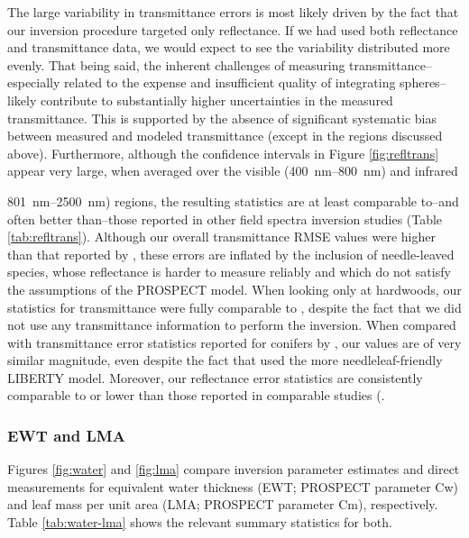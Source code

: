 The large variability in transmittance errors is most likely driven by the
fact that our inversion procedure targeted only reflectance. If we had used
both reflectance and transmittance data, we would expect to see the
variability distributed more evenly. That being said, the inherent challenges
of measuring transmittance--especially related to the expense and insufficient
quality of integrating spheres--likely contribute to substantially higher
uncertainties in the measured transmittance. This is supported by the absence
of significant systematic bias between measured and modeled transmittance
(except in the regions discussed above).  Furthermore, although the confidence
intervals in Figure \ref{fig:refltrans} appear very large, when averaged over
the visible (\SIrange{400}{800}{\nano\meter}) and infrared
{\SIrange{801}{2500}{\nano\meter}) regions, the resulting statistics are at
least comparable to--and often better than--those reported in other field
spectra inversion studies (Table \ref{tab:refltrans}).  Although our overall
transmittance RMSE values were higher than that reported by \cite{Feret2008},
these errors are inflated by the inclusion of needle-leaved species, whose
reflectance is harder to measure reliably and which do not satisfy the
assumptions of the PROSPECT model.  When looking only at hardwoods, our
statistics for transmittance were fully comparable to \cite{Feret2008},
despite the fact that we did not use any transmittance information to perform
the inversion.  When compared with transmittance error statistics reported for
conifers by \cite{DiVittorio2009}, our values are of very similar magnitude,
even despite the fact that \cite{DiVittorio2009} used the more
needleleaf-friendly LIBERTY model.  Moreover, our reflectance error statistics
are consistently comparable to or lower than those reported in comparable
studies (\cite{Feret2008, DiVittorio2009}.

 

\subsubsection{EWT and LMA}

Figures \ref{fig:water} and \ref{fig:lma} compare inversion parameter
estimates and direct measurements for equivalent water thickness (EWT;
PROSPECT parameter Cw) and leaf mass per unit area (LMA; PROSPECT parameter
Cm), respectively. Table \ref{tab:water-lma} shows the relevant summary
statistics for both. 

}
